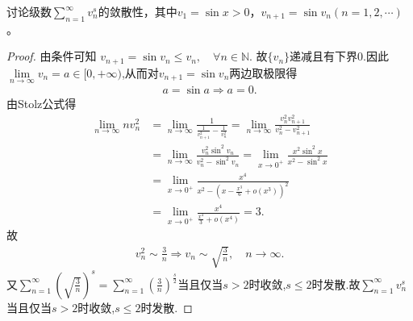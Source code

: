 \documentclass[../../main.tex]{subfiles}%
\begin{document}
\begin{example}
讨论级数$\sum\limits_{n=1}^{\infty} v_n^s$的敛散性，其中$v_1 = \sin x > 0$，$v_{n+1} = \sin v_n (n = 1, 2, \cdots)$。
\end{example}
\begin{proof}

由条件可知
$v_{n+1}=\sin v_n\leqslant v_n,\quad \forall n\in \mathbb{N} .$
故$\{ v_n \}$递减且有下界$0.$因此$\lim\limits_{n\rightarrow \infty}v_n=a\in [ 0,+\infty )$,从而对$v_{n+1}=\sin v_n$两边取极限得
\begin{align*}
a=\sin a\Longrightarrow a=0.
\end{align*}
由Stolz公式得
\begin{align*}
\lim\limits_{n\rightarrow \infty}nv_{n}^{2}&=\lim\limits_{n\rightarrow \infty}\frac{1}{\frac{1}{v_{n+1}^{2}}-\frac{1}{v_{n}^{2}}}=\lim\limits_{n\rightarrow \infty}\frac{v_{n}^{2}v_{n+1}^{2}}{v_{n}^{2}-v_{n+1}^{2}}
\\
&=\lim\limits_{n\rightarrow \infty}\frac{v_{n}^{2}\sin ^2v_n}{v_{n}^{2}-\sin ^2v_n}=\lim\limits_{x\rightarrow 0^+}\frac{x^2\sin ^2x}{x^2-\sin ^2x}
\\
&=\lim\limits_{x\rightarrow 0^+}\frac{x^4}{x^2-\left( x-\frac{x^3}{6}+o\left( x^3 \right) \right) ^2}
\\
&=\lim\limits_{x\rightarrow 0^+}\frac{x^4}{\frac{x^4}{3}+o\left( x^4 \right)}=3.
\end{align*}
故
\begin{align*}
v_{n}^{2}\sim \frac{3}{n}\Longrightarrow v_n\sim \sqrt{\frac{3}{n}},\quad n\rightarrow \infty .
\end{align*}
又$\sum_{n=1}^{\infty}{\left( \sqrt{\frac{3}{n}} \right) ^s}=\sum_{n=1}^{\infty}{\left( \frac{3}{n} \right) ^{\frac{s}{2}}}$当且仅当$s>2$时收敛,$s\leqslant 2$时发散.故$\sum_{n=1}^{\infty}{v_{n}^{s}}$当且仅当$s>2$时收敛,$s\leqslant 2$时发散.

\end{proof}
\end{document}

